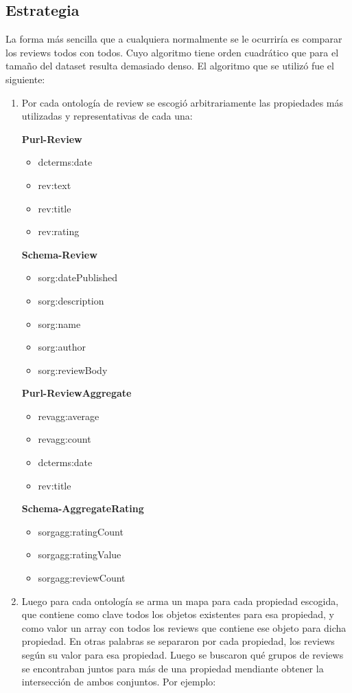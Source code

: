 \subsection*{Estrategia}
La forma más sencilla que a cualquiera normalmente se le ocurriría es comparar los reviews todos con todos. Cuyo algoritmo tiene orden cuadrático que para el tamaño del dataset resulta demasiado denso.
El algoritmo que se utilizó fue el siguiente:
\begin{enumerate}
\item Por cada ontología de review se escogió arbitrariamente las propiedades más utilizadas y representativas de cada una:

\textbf{Purl-Review}
\begin{itemize}
\item dcterms:date
\item rev:text
\item rev:title
\item rev:rating
\end{itemize}


\textbf{Schema-Review}
\begin{itemize}
\item sorg:datePublished
\item sorg:description
\item sorg:name
\item sorg:author
\item sorg:reviewBody
\end{itemize}

\textbf{Purl-ReviewAggregate}

\begin{itemize}
\item revagg:average
\item revagg:count
\item dcterms:date
\item rev:title
\end{itemize}

\textbf{Schema-AggregateRating}

\begin{itemize}
\item sorgagg:ratingCount
\item sorgagg:ratingValue
\item sorgagg:reviewCount
\end{itemize}

\item Luego para cada ontología se arma un mapa para cada propiedad escogida, que contiene como clave todos los objetos existentes para esa propiedad, y 
como valor un array con todos los reviews que contiene ese objeto para dicha propiedad.
En otras palabras se separaron por cada propiedad, los reviews según su valor para esa propiedad.
Luego se buscaron qué grupos de reviews se encontraban juntos para más de una propiedad mendiante obtener la intersección de ambos conjuntos. Por ejemplo:


\end{enumerate}
